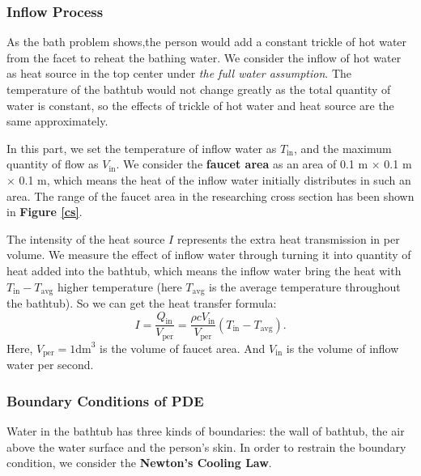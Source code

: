 \documentclass[12pt]{article}
\begin{document}
\subsubsection{Inflow Process}
As the bath problem shows,the person would add a constant trickle of hot water from the facet to
reheat the bathing water. We consider the inflow of hot water as heat source in the top center under
\emph{the full water assumption}. The temperature of the bathtub would not change greatly as the
total quantity of water is constant, so the effects of trickle of hot water and heat source are the
same approximately.

In this part, we set the temperature of inflow water as $T_\mathrm{in}$, and the maximum quantity of
flow as $V_\mathrm{in}$. We consider the \textbf{faucet area} as an area of 0.1 m $\times$ 0.1 m
$\times$ 0.1 m, which means the heat of the inflow water initially distributes in such an area. The
range of the faucet area in the researching cross section has been shown in \textbf{Figure
\ref{cs}}.

The intensity of the heat source $I$ represents the extra heat transmission in per volume. We
measure the effect of inflow water through turning it into quantity of heat added into the bathtub,
which means the inflow water bring the heat with $T_\mathrm{in}-T_\mathrm{avg}$ higher temperature
(here $T_\mathrm{avg}$ is the average temperature throughout the bathtub). So we can get the heat
transfer formula:
\begin{equation}
I=\frac{Q_\mathrm{in}}{V_\mathrm{per}}=\frac{\rho cV_\mathrm{in}}{V_\mathrm{per}}
(T_\mathrm{in}-T_\mathrm{avg}).
\end{equation}
Here, $V_\mathrm{per}=1\mathrm{dm}^3$ is the volume of faucet area. And $V_\mathrm{in}$ is the
volume of inflow water per second.

\subsubsection{Boundary Conditions of PDE}
Water in the bathtub has three kinds of boundaries: the wall of bathtub, the air above the water
surface and the person's skin. In order to restrain the boundary condition, we consider the
\textbf{Newton's Cooling Law}.
\end{document}
